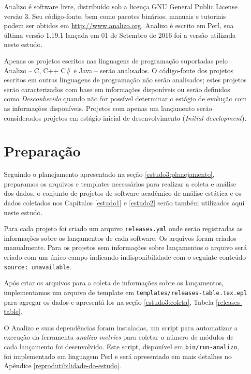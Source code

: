 Analizo é software livre, distribuído sob a licença GNU General Public License
versão 3. Seu código-fonte, bem como pacotes binários, manuais e tutoriais
podem ser obtidos em \url{http://www.analizo.org}. Analizo é escrito em Perl,
sua última versão 1.19.1 lançada em 01 de Setembro de 2016 foi a versão
utilizada neste estudo.

Apenas os projetos escritos nas linguagens de programação suportadas pelo Analizo 
-- C, C++ C\# e Java -- serão analisados.
O código-fonte dos projetos escritos em
outras linguagens de programação não serão analisados; 
estes projetos serão caracterizados com base em informações disponíveis ou 
serão definidos como {\it Desconhecido} quando não for possível determinar 
o estágio de evolução com as informações disponíveis. Projetos com apenas um
lançamento serão considerados projetos em estágio inicial de desenvolvimento
({\it Initial development}).


\section{Preparação} \label{estudo3:preparacao} %

Seguindo o planejamento apresentado na seção \ref{estudo3:planejamento},
preparamos os arquivos e templates necessários para realizar a coleta e análise
dos dados, o conjunto de projetos de software acadêmico de análise estática e
os dados coletados nos Capítulos \ref{estudo1} e \ref{estudo2} serão também
utilizados aqui neste estudo.

Para cada projeto foi criado um arquivo \texttt{releases.yml}
onde serão registradas as
informações sobre os lançamentos de cada software. Os arquivos foram criados
manualmente. Para os projetos sem informações sobre lançamentos o arquivo será
criado com um único campo indicando indisponibilidade com o seguinte conteúdo
\texttt{source: unavailable}.

Após criar os arquivos para a coleta de informações sobre os lançamentos,
implementamos um arquivo de template em
\texttt{templates/releases-table.tex.epl} para agregar os dados e apresentá-los
na seção \ref{estudo3:coleta}, Tabela \ref{releases-table}.

O Analizo e suas dependências foram instaladas, um script para automatizar a
execução da ferramenta {\it analizo metrics} para coletar o número de módulos
de cada lançamento foi desenvolvido. Este script, disponível em
\texttt{bin/run-analizo}, foi implementado em linguagem Perl e será apresentado
em mais detalhes no Apêndice \ref{reprodutibilidade-do-estudo}.

